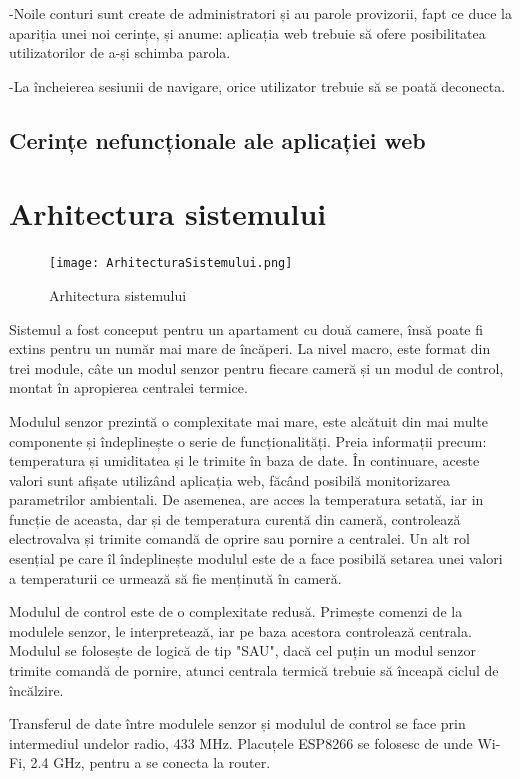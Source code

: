 	-Noile conturi sunt create de administratori și au parole provizorii, fapt ce duce la apariția unei noi cerințe, și anume: aplicația web trebuie să ofere posibilitatea utilizatorilor de a-și schimba parola.   

	-La încheierea sesiunii de navigare, orice utilizator trebuie să se poată deconecta. 	 

\subsection{Cerințe nefuncționale ale aplicației web}

	
	

\section{Arhitectura sistemului}

\begin{figure}[H]
   	\centering
    	\texttt{[image: ArhitecturaSistemului.png]}
	\caption{Arhitectura sistemului}
\end{figure}

	Sistemul a fost conceput pentru un apartament cu două camere, însă poate fi extins pentru un număr mai mare de încăperi. La nivel macro, este format din trei module, câte un modul senzor pentru fiecare cameră și un modul de control, montat în apropierea centralei termice.

	Modulul senzor prezintă o complexitate mai mare, este alcătuit din mai multe componente și îndeplinește o serie de funcționalități. Preia informații precum: temperatura și umiditatea și le trimite în baza de date. În continuare, aceste valori sunt afișate utilizând aplicația web, făcând posibilă monitorizarea parametrilor ambientali. De asemenea, are acces la temperatura setată, iar in funcție de aceasta, dar și de temperatura curentă din cameră, controlează electrovalva și trimite comandă de oprire sau pornire a centralei. Un alt rol esențial pe care îl îndeplinește modulul este de a face posibilă setarea unei valori a temperaturii ce urmează să fie menținută în cameră.

	Modulul de control este de o complexitate redusă. Primește comenzi de la modulele senzor, le interpretează, iar pe baza acestora controlează centrala. Modulul se folosește de logică de tip "SAU", dacă cel puțin un modul senzor trimite comandă de pornire, atunci centrala termică trebuie să înceapă ciclul de încălzire.

	Transferul de date între modulele senzor și modulul de control se face prin intermediul undelor radio, 433 MHz. Placuțele ESP8266 se folosesc de unde Wi-Fi, 2.4 GHz, pentru a se conecta la router.

